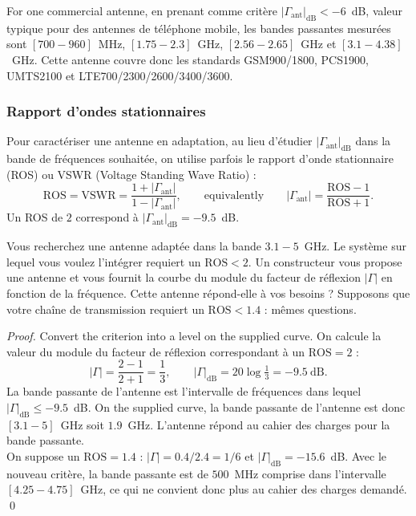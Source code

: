 \begin{example}
  For one commercial antenne, en prenant comme critère
  $|\Gamma_{\mathrm{ant}}|_{\mathrm{dB}} < -6$~dB, valeur typique pour des
  antennes de téléphone mobile, les bandes passantes mesurées sont
  $[700 - 960]$~MHz, $[1.75 - 2.3]$~GHz, $[2.56 - 2.65]$~GHz et
  $[3.1 - 4.38]$~GHz. Cette antenne couvre donc les standards GSM900/1800,
  PCS1900, UMTS2100 et LTE700/2300/2600/3400/3600.
\end{example}

\subsubsection{Rapport d'ondes stationnaires}

\begin{definition}
  Pour caractériser une antenne en adaptation, au lieu d'étudier
  $|\Gamma_{\mathrm{ant}}|_{\mathrm{dB}}$ dans la bande de fréquences souhaitée,
  on utilise parfois le rapport d'onde stationnaire (ROS) ou VSWR (Voltage
  Standing Wave Ratio) :
  \[ \mathrm{ROS} = \mathrm{VSWR} = \frac{1 + |\Gamma_{\mathrm{ant}}|}{1 - |\Gamma_{\mathrm{ant}}|},
     \qquad\text{equivalently}\qquad
     |\Gamma_{\mathrm{ant}}| = \frac{\mathrm{ROS} - 1}{\mathrm{ROS} + 1}. \]
  Un ROS de $2$ correspond à $|\Gamma_{\mathrm{ant}}|_{\mathrm{dB}} = -9.5$~dB.
\end{definition}

\begin{problem}
  Vous recherchez une antenne adaptée dans la bande $3.1 - 5$~GHz. Le système
  sur lequel vous voulez l'intégrer requiert un $\mathrm{ROS} < 2$. Un
  constructeur vous propose une antenne et vous fournit la courbe du module du
  facteur de réflexion $|\Gamma|$ en fonction de la fréquence. Cette antenne
  répond-elle à vos besoins ? Supposons que votre chaîne de transmission
  requiert un $\mathrm{ROS} < 1.4$ : mêmes questions.
\end{problem}

\begin{proof}
  Convert the criterion into a level on the supplied curve. On calcule la
  valeur du module du facteur de réflexion correspondant à un
  $\mathrm{ROS} = 2$ :
  \[ |\Gamma| = \frac{2-1}{2+1} = \frac{1}{3}, \qquad
     |\Gamma|_{\mathrm{dB}} = 20 \log \tfrac{1}{3} = -9.5\ \mathrm{dB}. \]
  La bande passante de l'antenne est l'intervalle de fréquences dans lequel
  $|\Gamma|_{\mathrm{dB}} \le -9.5$~dB. On the supplied curve, la bande passante
  de l'antenne est donc $[3.1 - 5]$~GHz soit $1.9$~GHz. L'antenne répond au
  cahier des charges pour la bande passante.\\

  On suppose un $\mathrm{ROS} = 1.4$ : $|\Gamma| = 0.4/2.4 = 1/6$ et
  $|\Gamma|_{\mathrm{dB}} = -15.6$~dB. Avec le nouveau critère, la bande
  passante est de $500$~MHz comprise dans l'intervalle $[4.25 - 4.75]$~GHz, ce
  qui ne convient donc plus au cahier des charges demandé. \qed
\end{proof}

